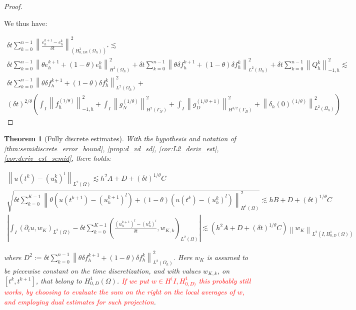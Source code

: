 \documentclass[english,a4paper,10pt,oneside]{scrbook}	%
\theoremstyle{break}
\newtheorem{thm}[equation]{Theorem}
\newenvironment{mproof}[1][\proofname]{%
  \begin{proof}[#1]$ $\par\nobreak\ignorespaces
}{%
  \end{proof}
}
\renewcommand*{\proofname}{Proof}
\theoremstyle{remark}
\newcommand{\ds}{\displaystyle}
\newcommand{\norm}[1]{\left\lVert#1\right\rVert}
\begin{document}
\begin{mproof}
We thus have:

\begin{align*}
\delta t \sum_{k=0}^{n-1} \norm{ \frac{e_{h}^{k+1}-e_h^k}{\delta t}}_{(H^1_{0,Dh}(\Omega_h))^*}^2 \lesssim  \\\delta t \sum_{k=0}^{n-1}\norm{\theta e_h^{k+1}+(1-\theta)e^k_h}_{H^1(\Omega_h)}^2 + \delta t \sum_{k=0}^{n-1} \norm{\theta \delta f_h^{k+1}+(1-\theta)\delta f_h^k}_{L^2(\Omega_h)}^2+ \delta t \sum_{k=0}^{n-1} \norm{Q_h^k}_{-1,h}^2\lesssim\\
\delta t \sum_{k=0}^{n-1} \norm{\theta \delta f_h^{k+1}+(1-\theta)\delta f_h^k}_{L^2(\Omega_h)}^2 +\\
(\delta t)^{2/\theta} \left( \int_I \norm{f^{(1/\theta)}_h}_{-1,h}^2+\int_I\norm{ g_{N}^{(1/\theta)}}_{H^{2}(\Gamma_{N})}^2 + \int_I\norm{g_D^{(1/\theta+1)}}_{H^{3/2}(\Gamma_D)}^2 + \norm{\delta_{h}(0)^{(1/\theta)}}_{L^2(\Omega_h)}^2\right)
\end{align*}

\end{mproof}

\begin{thm}[Fully discrete estimates]
\label{thm:fully_discr_est_par}
With the hypothesis and notation of \cref{thm:semidiscrete_error_bound}, \cref{prop:d_vd_sd}, \cref{cor:L2_deriv_est}, \cref{cor:deriv_est_semid}, there holds:

\begin{align*}
	\norm{u(t^k)-(u_h^k)^l}_{L^2(\Omega)}\lesssim  h^2 A  + D +  (\delta t)^{1/\theta}C\\
	\sqrt{\delta t \sum_{k=0}^{K-1} \norm{\theta(u(t^{k+1}) - (u_h^{k+1})^l) + (1-\theta)(u(t^{k}) - (u_h^{k})^l)}_{H^1(\Omega)}^2} \lesssim hB + D + (\delta t)^{1/\theta} C\\
	\left | \int_I (\partial_t u , w_K)_{L^2(\Omega)}-\delta t \sum_{k=0}^{K-1}\left ( \frac{(u^{k+1}_h)^l - (u_h^k)^l}{\delta t} , w_{K,k}\right )_{L^2(\Omega)} \right |\lesssim \left ( h^2A + D + (\delta t)^{1/\theta} C\right ) \norm{w_K}_{L^2(I,H^1_{0,D}(\Omega))}
\end{align*}

where $D^2:= \ds {\delta t\sum_{k=0}^{n-1} \norm{\theta \delta f_h^{k+1}+(1-\theta)\delta f_h^k}_{L^2(\Omega_h)}^2}$. Here $w_K$ is assumed to be piecewise constant on the time discretization, and with values $w_{K,k}$, on $[t^k,t^{k+1}]$, that belong to $H^1_{0,D}(\Omega)$. \textcolor{red}{If we put $w \in H^(I,H^1_{0,D)}$ this probably still works, by choosing to evaluate the sum on the right on the local averages of $w$, and employing dual estimates for such projection}.
\end{thm}
\end{document}
